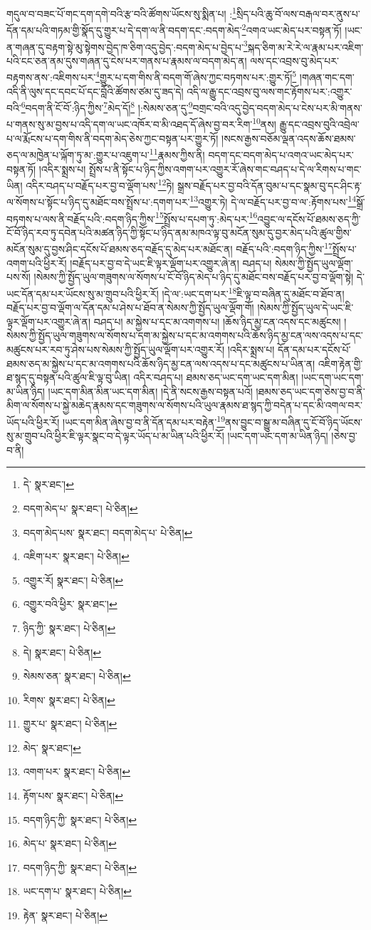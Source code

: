 གདུལ་བ་བཟང་པོ་གང་དག་དགེ་བའི་རྩ་བའི་ཚོགས་ཡོངས་སུ་སྨིན་པ། :\footnote{དེ་  སྣར་ཐང་། }སྲིད་པའི་ཆུ་བོ་ལས་བརྒལ་བར་ནུས་པ་དོན་དམ་པའི་གཏམ་གྱི་སྣོད་དུ་གྱུར་པ་དེ་དག་ལ་ནི་བདག་དང་:བདག་མེད་\footnote{བདག་མེད་པ་  སྣར་ཐང་།  པེ་ཅིན། }འགའ་ཡང་མེད་པར་བསྟན་ཏོ། །ཡང་ན་གཞན་དུ་བརྟག་སྟེ་མུ་སྟེགས་བྱེད་ཁ་ཅིག་འདུ་བྱེད་:བདག་མེད་པ་བྱེད་པ་\footnote{བདག་མེད་པས་  སྣར་ཐང་། བདག་མེད་པ་  པེ་ཅིན། }སྐད་ཅིག་མ་རེ་རེ་ལ་རྣམ་པར་འཇིག་པའི་ངང་ཅན་ནམ་དུས་གཞན་དུ་ངེས་པར་གནས་པ་རྣམས་ལ་བདག་མེད་ན། ལས་དང་འབྲས་བུ་མེད་པར་བརྟགས་ནས་:འཇིགས་པར་\footnote{འཇིག་པར་  སྣར་ཐང་།  པེ་ཅིན། }གྱུར་པ་དག་གིས་ནི་བདག་གོ་ཞེས་ཀྱང་བཏགས་པར་:གྱུར་ཏོ།\footnote{འགྱུར་རོ།  སྣར་ཐང་།  པེ་ཅིན། } །གཞན་གང་དག་འདི་ནི་ལུས་དང་དབང་པོ་དང་བློའི་ཚོགས་ཙམ་དུ་ཟད་དེ། འདི་ལ་རྒྱུ་དང་འབྲས་བུ་ལས་གང་རྟོགས་པར་:འགྱུར་བའི་\footnote{འགྱུར་བའི་ཕྱིར་  སྣར་ཐང་། }བདག་ནི་ངོ་བོ་:ཉིད་ཀྱིས་\footnote{ཉིད་ཀྱི་  སྣར་ཐང་།  པེ་ཅིན། }མེད་དོ།\footnote{དེ།  སྣར་ཐང་།  པེ་ཅིན། } །:སེམས་ཅན་དུ་\footnote{སེམས་ཅན་  སྣར་ཐང་།  པེ་ཅིན། }བགྲང་བའི་འདུ་བྱེད་བདག་མེད་པ་ངེས་པར་མི་གནས་པ་གནས་སུ་མ་བྱས་པ་འདི་དག་ལ་ཡང་འཁོར་བ་མི་འཐད་དོ་ཞེས་བྱ་བར་རིག་\footnote{རིགས་  སྣར་ཐང་།  པེ་ཅིན། }ནས། རྒྱུ་དང་འབྲས་བུའི་འབྲེལ་པ་ལ་རྨོངས་པ་དག་གིས་ནི་བདག་མེད་ཅེས་ཀྱང་བསྟན་པར་གྱུར་ཏོ། །སངས་རྒྱས་བཅོམ་ལྡན་འདས་ཆོས་ཐམས་ཅད་ལ་མཁྱེན་པ་ལྐོག་ཏུ་མ་:གྱུར་པ་འཇུག་པ་\footnote{གྱུར་པ་  སྣར་ཐང་།  པེ་ཅིན། }རྣམས་ཀྱིས་ནི། བདག་དང་བདག་མེད་པ་འགའ་ཡང་མེད་པར་བསྟན་ཏོ། །འདིར་སྨྲས་པ། སྤྲོས་པ་ནི་སྟོང་པ་ཉིད་ཀྱིས་འགག་པར་འགྱུར་རོ་ཞེས་གང་བཤད་པ་དེ་ལ་རིགས་པ་གང་ཡིན། འདིར་བཤད་པ་བརྗོད་པར་བྱ་བ་ལྡོག་པས་\footnote{མེད་  སྣར་ཐང་། }ཏེ། སྒྲས་བརྗོད་པར་བྱ་བའི་དོན་བུམ་པ་དང་སྣམ་བུ་དང་ཤིང་རྟ་ལ་སོགས་པ་སྟོང་པ་ཉིད་དུ་མཐོང་བས་སྤྲོས་པ་:དགག་པར་\footnote{འགག་པར་  སྣར་ཐང་།  པེ་ཅིན། }འགྱུར་ཏེ། དེ་ལ་བརྗོད་པར་བྱ་བ་ལ་:རྟོགས་པས་\footnote{རྟོག་པས་  སྣར་ཐང་།  པེ་ཅིན། }སྒྲོ་བཏགས་པ་ལས་ནི་བརྗོད་པའི་:བདག་ཉིད་ཀྱིས་\footnote{བདག་ཉིད་ཀྱི་  སྣར་ཐང་།  པེ་ཅིན། }སྤྲོས་པ་དཔག་ཏུ་:མེད་པར་\footnote{མེད་པ་  སྣར་ཐང་།  པེ་ཅིན། }འབྱུང་ལ་དངོས་པོ་ཐམས་ཅད་ཀྱི་ངོ་བོ་ཉིད་རབ་ཏུ་དབེན་པའི་མཚན་ཉིད་ཀྱི་སྟོང་པ་ཉིད་ནམ་མཁའ་ལྟ་བུ་མངོན་སུམ་དུ་བྱར་མེད་པའི་ཚུལ་གྱིས་མངོན་སུམ་དུ་བྱས་ཤིང་དངོས་པོ་ཐམས་ཅད་བརྗོད་དུ་མེད་པར་མཐོང་ན། བརྗོད་པའི་:བདག་ཉིད་ཀྱིས་\footnote{བདག་ཉིད་ཀྱི་  སྣར་ཐང་།  པེ་ཅིན། }སྤྲོས་པ་འགག་པའི་ཕྱིར་རོ། །བརྗོད་པར་བྱ་བ་དེ་ཡང་ཇི་ལྟར་ལྡོག་པར་འགྱུར་ཞེ་ན། བཤད་པ། སེམས་ཀྱི་སྤྱོད་ཡུལ་ལྡོག་པས་སོ། །སེམས་ཀྱི་སྤྱོད་ཡུལ་གཟུགས་ལ་སོགས་པ་ངོ་བོ་ཉིད་མེད་པ་ཉིད་དུ་མཐོང་བས་བརྗོད་པར་བྱ་བ་ལྡོག་སྟེ། དེ་ཡང་དོན་དམ་པར་ཡོངས་སུ་མ་གྲུབ་པའི་ཕྱིར་རོ། །དེ་ལ་:ཡང་དག་པར་\footnote{ཡང་དག་པ་  སྣར་ཐང་།  པེ་ཅིན། }ཇི་ལྟ་བ་བཞིན་དུ་མཐོང་བ་ཐོབ་ན། བརྗོད་པར་བྱ་བ་ལྡོག་ལ་དོན་དམ་པ་ཤེས་པ་ཐོབ་ན་སེམས་ཀྱི་སྤྱོད་ཡུལ་ལྡོག་གོ། །སེམས་ཀྱི་སྤྱོད་ཡུལ་དེ་ཡང་ཇི་ལྟར་ལྡོག་པར་འགྱུར་ཞེ་ན། བཤད་པ། མ་སྐྱེས་པ་དང་མ་འགགས་པ། །ཆོས་ཉིད་མྱ་ངན་འདས་དང་མཚུངས། །སེམས་ཀྱི་སྤྱོད་ཡུལ་གཟུགས་ལ་སོགས་པ་དག་མ་སྐྱེས་པ་དང་མ་འགགས་པའི་ཆོས་ཉིད་མྱ་ངན་ལས་འདས་པ་དང་མཚུངས་པར་རབ་ཏུ་ཤེས་པས་སེམས་ཀྱི་སྤྱོད་ཡུལ་ལྡོག་པར་འགྱུར་རོ། །འདིར་སྨྲས་པ། དོན་དམ་པར་དངོས་པོ་ཐམས་ཅད་མ་སྐྱེས་པ་དང་མ་འགགས་པའི་ཆོས་ཉིད་མྱ་ངན་ལས་འདས་པ་དང་མཚུངས་པ་ཡིན་ན། འཇིག་རྟེན་གྱི་ཐ་སྙད་དུ་བསྟན་པའི་ཚུལ་ཇི་ལྟ་བུ་ཡིན། འདིར་བཤད་པ། ཐམས་ཅད་ཡང་དག་ཡང་དག་མིན། །ཡང་དག་ཡང་དག་མ་ཡིན་ཉིད། །ཡང་དག་མིན་མིན་ཡང་དག་མིན། །དེ་ནི་སངས་རྒྱས་བསྟན་པའོ། །ཐམས་ཅད་ཡང་དག་ཅེས་བྱ་བ་ནི་མིག་ལ་སོགས་པ་སྐྱེ་མཆེད་རྣམས་དང་གཟུགས་ལ་སོགས་པའི་ཡུལ་རྣམས་ཐ་སྙད་ཀྱི་བདེན་པ་དང་མི་འགལ་བར་ཡོད་པའི་ཕྱིར་རོ། །ཡང་དག་མིན་ཞེས་བྱ་བ་ནི་དོན་དམ་པར་བརྟེན་\footnote{རྟེན་  སྣར་ཐང་།  པེ་ཅིན། }ནས་བྱུང་བ་སྒྱུ་མ་བཞིན་དུ་ངོ་བོ་ཉིད་ཡོངས་སུ་མ་གྲུབ་པའི་ཕྱིར་ཇི་ལྟར་སྣང་བ་དེ་ལྟར་ཡོད་པ་མ་ཡིན་པའི་ཕྱིར་རོ། །ཡང་དག་ཡང་དག་མ་ཡིན་ཉིད། །ཅེས་བྱ་བ་ནི། 